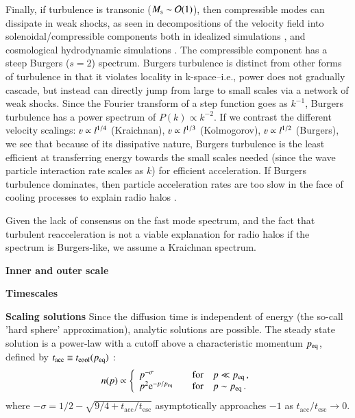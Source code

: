 \documentclass[fleqn,usenatbib,useAMS]{mnras}
\begin{document}
Finally, if turbulence is transonic ($M_{\rm s} \sim {\mathcal O}(1)$), then compressible modes can dissipate in weak shocks, as seen in decompositions of the velocity field into solenoidal/compressible components both in idealized simulations \citep{kowal10,porter15}, and cosmological hydrodynamic simulations \citep{2015ApJ...800...60M}. The compressible component has a steep Burgers ($s=2$) spectrum. Burgers turbulence is distinct from other forms of turbulence in that it violates locality in k-space--i.e., power does not gradually cascade, but instead can directly jump from large to small scales via a network of weak shocks. Since the Fourier transform of a step function goes as $k^{-1}$, Burgers turbulence has a power spectrum of $P(k) \propto k^{-2}$. If we contrast the different velocity scalings: $\varv \propto l^{1/4}$ (Kraichnan), $\varv \propto l^{1/3}$ (Kolmogorov), $\varv \propto l^{1/2}$ (Burgers), we see that because of its dissipative nature, Burgers turbulence is the least efficient at transferring energy towards the small scales needed (since the wave particle interaction rate scales as $k$) for efficient acceleration. If Burgers turbulence dominates, then particle acceleration rates are too slow in the face of cooling processes to explain radio halos \citep{2015ApJ...800...60M}.

Given the lack of consensus on the fast mode spectrum, and the fact that turbulent reacceleration is not a viable explanation for radio halos if the spectrum is Burgers-like, we assume a Kraichnan spectrum. 

{\bf Inner and outer scale}

{\bf Timescales} 

{\bf Scaling solutions} Since the diffusion time is independent of energy (the so-call 'hard sphere' approximation), analytic solutions are possible. The steady state solution is a power-law with a cutoff above a characteristic momentum $p_{\rm eq}$, defined by $t_{\rm acc} \equiv t_{\rm cool} (p_{\rm eq})$ \citep{stawarz08}: 
\begin{equation}
n(p) \propto \left \{
\begin{array}{ll}
p^{-\sigma} & \quad \text{for} \quad p \ll p_{\text{eq}} \, , \\
p^2 {\rm e}^{-p/p_{\text{eq}}} & \quad \text{for} \quad p \sim p_{\text{eq}} \,.
\end{array}
\right.
\end{equation}
%
where $-\sigma = 1/2 - \sqrt{9/4 +
  t_\text{acc}/t_\text{esc}}$ asymptotically approaches $-1$
as $t_\text{acc}/t_\text{esc} \rightarrow 0$.
\end{document}
